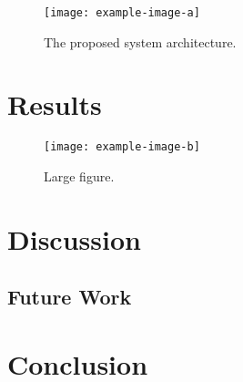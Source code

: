 \documentclass[conference]{IEEEtran}
\begin{document}
\begin{figure}[h!]
\centering
\texttt{[image: example-image-a]}
\caption{The proposed system architecture.}
\end{figure}


\section{Results}
\par \blindtext


\begin{figure*}[h!]
\centering
\texttt{[image: example-image-b]}
\caption{Large figure.}
\end{figure*}


\section{Discussion}
\subsection{Future Work}
\par \blindtext

\section{Conclusion}
\par \blindtext



\nocite{*}


\end{document}
